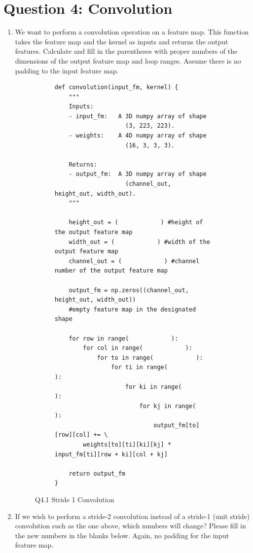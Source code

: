 \documentclass[12pt]{article}
\begin{document}
\section*{Question 4: Convolution }
\begin{enumerate}
    \item We want to perform a convolution operation on a feature map. This function takes the feature map and the kernel as inputs and returns the output features. Calculate and fill in the parentheses with proper numbers of the dimensions of the output feature map and loop ranges. Assume there is no padding to the input feature map. \\
\begin{figure}[h!]
\hspace{3em}
\begin{subfigure}[b]{0.8\textwidth}
    \begin{verbatim}
def convolution(input_fm, kernel) {
    """
    Inputs:
    - input_fm:   A 3D numpy array of shape 
                    (3, 223, 223).
    - weights:    A 4D numpy array of shape 
                    (16, 3, 3, 3).
    
    Returns:
    - output_fm:  A 3D numpy array of shape 
                    (channel_out, height_out, width_out).
    """

    height_out = (            ) #height of the output feature map
    width_out = (            ) #width of the output feature map
    channel_out = (            ) #channel number of the output feature map

    output_fm = np.zeros((channel_out, height_out, width_out)) 
    #empty feature map in the designated shape
    
    for row in range(            ):
        for col in range(            ):
            for to in range(            ):
                for ti in range(            ):
                    for ki in range(            ):
                        for kj in range(            ):
                            output_fm[to][row][col] += \
        weights[to][ti][ki][kj] * input_fm[ti][row + ki][col + kj]

    return output_fm
}
    \end{verbatim}
\end{subfigure}
\caption{Q4.1 Stride 1 Convolution}
\end{figure}

\newpage
\item If we wish to perform a stride-2 convolution instead of a stride-1 (unit stride) convolution such as the one above, which numbers will change? Please fill in the new numbers in the blanks below. Again, no padding for the input feature map.


\end{enumerate}
\end{document}
